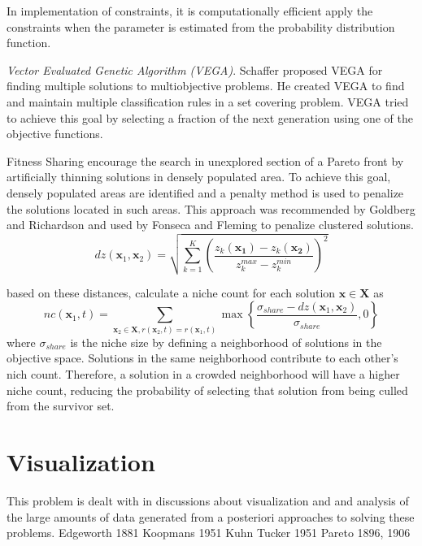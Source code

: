 In implementation of constraints, it is computationally efficient apply the constraints when the parameter is estimated from the probability distribution function.

\emph{Vector Evaluated Genetic Algorithm (VEGA)}.  Schaffer proposed VEGA for finding multiple solutions to multiobjective problems.  He created VEGA to find and maintain multiple classification rules in a set covering problem.  VEGA tried to achieve this goal by selecting a fraction of the next generation using one of the objective functions.

Fitness Sharing encourage the search in unexplored section of a Pareto front by artificially thinning solutions in densely populated area.  To achieve this goal, densely populated areas are identified and a penalty method is used to penalize the solutions located in such areas.  This approach was recommended by Goldberg and Richardson\cite{goldberg1987genetic} and used by Fonseca and Fleming\cite{fonseca1993multiobjective} to penalize clustered solutions.
\begin{equation}
    dz(\bm{x}_1,\bm{x}_2)
    = \sqrt{\sum_{k=1}^{K}  \left(\frac{z_k(\bm{x_1})-z_k(\bm{x_2})}
                                       {z_{k}^{max}-z_{k}^{min}}
                            \right)^{2}
      }
\end{equation}

based on these distances, calculate a niche count for each solution $\bm{x}\in\bm{X}$ as
\begin{equation}
  nc(\bm{x}_1,t)=\sum_{\bm{x}_2\in\bm{X},r(\bm{x}_2,t)=r(\bm{x}_1,t)}
      \max\left\{ \frac{\sigma_{share}-dz(\bm{x}_1,\bm{x}_2)}
                       {\sigma_{share}},0
          \right\}
\end{equation}
where $\sigma_{share}$ is the niche size by defining a neighborhood of solutions in the objective space.  Solutions in the same neighborhood contribute to each other's nich count.  Therefore, a solution in a crowded neighborhood will have a higher niche count, reducing the probability of selecting that solution from being culled from the survivor set.

\section{Visualization}
This problem is dealt with in discussions about visualization and and analysis of the large amounts of data generated from a posteriori approaches to solving these problems.
Edgeworth 1881
Koopmans 1951
Kuhn Tucker 1951
Pareto 1896, 1906
